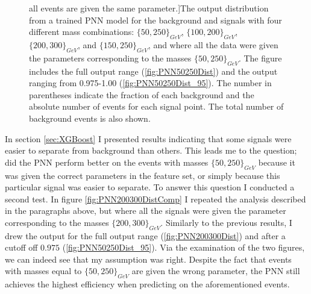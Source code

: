 \begin{figure}
    all events are given the same parameter.]{The output distribution from a trained \ac{PNN} model for the background and signals with four different 
    mass combinations: $\{50,250\}_{GeV}$, $\{100,200\}_{GeV}$, $\{200,300\}_{GeV}$, and $\{150,250\}_{GeV}$, and where all the data were given the 
    parameters corresponding to the masses $\{50,250\}_{GeV}$. The figure includes the full output range (\ref{fig:PNN50250Dist}) 
    and the output ranging from 0.975-1.00 (\ref{fig:PNN50250Dist_95}). The number in parentheses indicate the fraction of each background and 
    the absolute number of events for each signal point. The total number of background events is also shown.}
    \label{fig:PNN50250}
\end{figure} 
In section \ref{sec:XGBoost} I presented results indicating that some signals were easier to separate from background than others. This leads me to the 
question; did the \ac{PNN} perform better on the events with masses $\{50,250\}_{GeV}$ because it was given the correct parameters in the feature set, or simply
because this particular signal was easier to separate. To answer this question I conducted a second test. In figure \ref{fig:PNN200300DistComp} 
I repeated the analysis described in the paragraphs above, but where all the signals were given the parameter corresponding to the masses $\{200,300\}_{GeV}$.
Similarly to the previous results, I drew the output for the full output range (\ref{fig:PNN200300Dist}) and after a cutoff off $0.975$ (\ref{fig:PNN50250Dist_95}).
Via the examination of the two figures, we can indeed see that my assumption was right. Despite the fact that events with masses equal to  $\{50,250\}_{GeV}$
are given the wrong parameter, the \ac{PNN} still achieves the highest efficiency when predicting on the aforementioned events. \\
